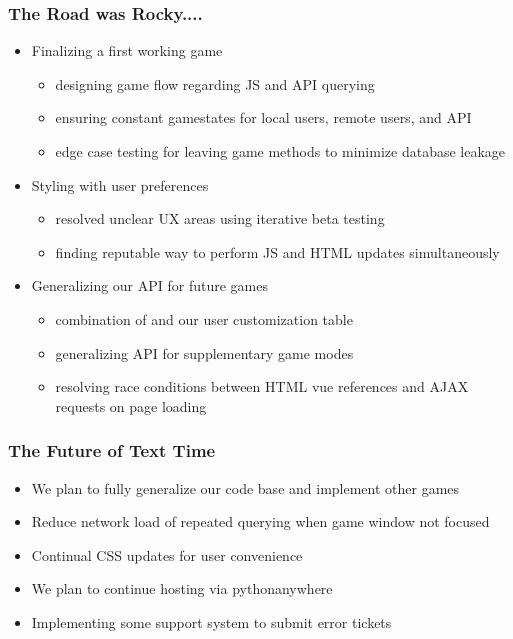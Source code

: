 \documentclass[t]{beamer}
\begin{document}
    \begin{frame}
        \frametitle{The Road was Rocky....}
        \begin{itemize}
            \item Finalizing a first working game
            \begin{itemize}
                \item designing game flow regarding JS and API querying
                \item ensuring constant gamestates for local users, remote users, and API
                \item edge case testing for leaving game methods to minimize database leakage
            \end{itemize}
            \item Styling with user preferences
            \begin{itemize}
                \item resolved unclear UX areas using iterative beta testing
                \item finding reputable way to perform JS and HTML updates simultaneously
            \end{itemize}
            \item Generalizing our API for future games
            \begin{itemize}
                \item combination of  and our user customization table
                \item generalizing API for supplementary game modes
                \item resolving race conditions between HTML vue references and AJAX requests on page loading
            \end{itemize}
          \end{itemize}
    \end{frame}

    \begin{frame}
        \frametitle{The Future of Text Time}
        \begin{itemize}
            \item We plan to fully generalize our code base and implement other games
            \item Reduce network load of repeated querying when game window not focused
            \item Continual CSS updates for user convenience
            \item We plan to continue hosting via pythonanywhere
            \item Implementing some support system to submit error tickets
        \end{itemize}
    \end{frame}
\end{document}
